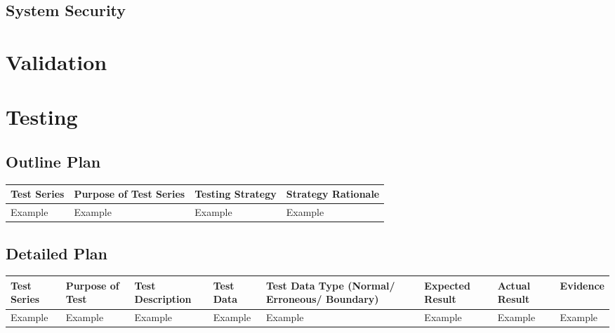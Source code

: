 \subsection{System Security}

\section{Validation}

\section{Testing}

\begin{landscape}
\subsection{Outline Plan}

\begin{center}
    \begin{tabular}{|p{2cm}|p{5cm}|p{5cm}|p{4cm}|}
        \hline
        \textbf{Test Series} & \textbf{Purpose of Test Series} & \textbf{Testing Strategy} & \textbf{Strategy Rationale}\\ \hline
        Example & Example & Example & Example \\ \hline
    \end{tabular}
\end{center}

\subsection{Detailed Plan}

\begin{center}
    \begin{longtable}{|p{1.5cm}|p{2.5cm}|p{2.5cm}|p{2cm}|p{2cm}|p{2cm}|p{2cm}|p{2cm}|}
        \hline
        \textbf{Test Series} & \textbf{Purpose of Test} & \textbf{Test Description} & \textbf{Test Data} & \textbf{Test Data Type (Normal/ Erroneous/ Boundary)} & \textbf{Expected Result} & \textbf{Actual Result} & \textbf{Evidence}\\ \hline
        Example & Example & Example & Example & Example & Example & Example & Example \\ \hline
    \end{longtable}
\end{center}
\end{landscape}
